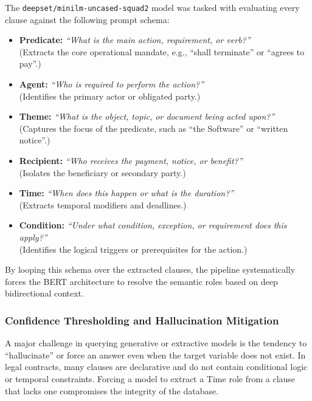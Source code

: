 \documentclass[twoside,final]{hcmut-report}
\begin{document}
\medskip

The \texttt{deepset/minilm-uncased-squad2} model was tasked with evaluating every clause against the following prompt schema:

\begin{itemize}[topsep=0pt, parsep=0pt, itemsep=0pt]
  \item \textbf{Predicate:} \emph{``What is the main action, requirement, or verb?''}\\
        (Extracts the core operational mandate, e.g., ``shall terminate'' or ``agrees to pay''.)
  \item \textbf{Agent:} \emph{``Who is required to perform the action?''}\\
        (Identifies the primary actor or obligated party.)
  \item \textbf{Theme:} \emph{``What is the object, topic, or document being acted upon?''}\\
        (Captures the focus of the predicate, such as ``the Software'' or ``written notice''.)
  \item \textbf{Recipient:} \emph{``Who receives the payment, notice, or benefit?''}\\
        (Isolates the beneficiary or secondary party.)
  \item \textbf{Time:} \emph{``When does this happen or what is the duration?''}\\
        (Extracts temporal modifiers and deadlines.)
  \item \textbf{Condition:} \emph{``Under what condition, exception, or requirement does this apply?''}\\
        (Identifies the logical triggers or prerequisites for the action.)
\end{itemize}

By looping this schema over the extracted clauses, the pipeline systematically forces the BERT architecture to resolve the semantic roles based on deep bidirectional context.

\subsubsection{Confidence Thresholding and Hallucination Mitigation}
A major challenge in querying generative or extractive models is the tendency to ``hallucinate'' or force an answer even when the target variable does not exist. In legal contracts, many clauses are declarative and do not contain conditional logic or temporal constraints. Forcing a model to extract a Time role from a clause that lacks one compromises the integrity of the database.
\end{document}
